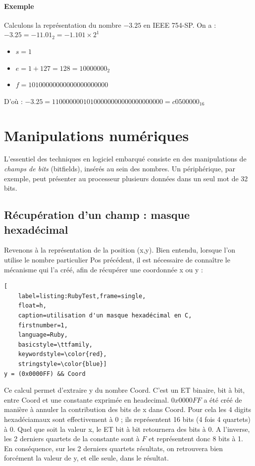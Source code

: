 \paragraph{Exemple}
Calculons la représentation du nombre $-3.25$ en IEEE 754-SP. On a : $-3.25=-11.01_2=-1.101 \times 2^1$
\begin{itemize}
  \item $s=1$
  \item $e=1+127=128=10000000_2$
  \item $f=10100000000000000000000$
\end{itemize}
D'où : $-3.25=11000000010100000000000000000000=c0500000_{16}$

\section{Manipulations numériques}

L'essentiel des techniques en logiciel embarqué consiste en des manipulations de {\it champs de bits} (bitfields), insérés au sein des nombres.
Un périphérique, par exemple, peut présenter au processeur plusieurs données dans un seul mot de 32 bits.

\subsection{Récupération d'un champ : masque hexadécimal}
Revenons à la représentation de la position (x,y).
Bien entendu, lorsque l'on utilise le nombre particulier Pos précédent,
il est nécessaire de connaître le mécanisme qui l'a créé, afin de récupérer
une coordonnée x ou y :
\begin{lstlisting}[
    label=listing:RubyTest,frame=single,
    float=h,
    caption=utilisation d'un masque hexadécimal en C,
    firstnumber=1,
    language=Ruby,
    basicstyle=\ttfamily,
    keywordstyle=\color{red},
    stringstyle=\color{blue}]
y = (0x0000FF) && Coord
\end{lstlisting}

Ce calcul permet d'extraire y du nombre Coord.
C'est un ET binaire, bit à bit, entre Coord et une constante exprimée en headecimal.
$0x0000FF$ a été créé de manière à annuler la contribution des bits de x dans Coord.
Pour cela les 4 digits hexadéciamaux sont effectivement à 0 ; ils représentent 16 bits
(4 fois 4 quartets) à 0. Quel que soit la valeur x, le ET bit à bit retournera des bits
à 0. A l'inverse, les 2 derniers quartets de la constante sont à $F$ et représentent
 donc 8 bits à 1. En conséquence, sur les 2 derniers quartets résultats, on retrouvera
 bien forcément la valeur de y, et elle seule, dans le résultat.



